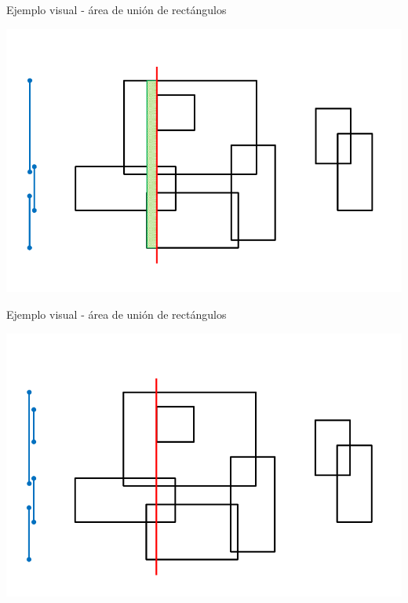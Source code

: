 \documentclass[compress]{beamer}
\begin{document}
\begin{frame}{Ejemplo visual - área de unión de rectángulos}
\begin{center}
\includegraphics[scale=0.4]{images/sweep_line_7.png}
\end{center}
\end{frame}

\begin{frame}{Ejemplo visual - área de unión de rectángulos}
\begin{center}
\includegraphics[scale=0.4]{images/sweep_line_8.png}
\end{center}
\end{frame}
\end{document}
